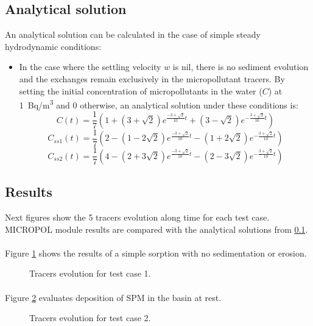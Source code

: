 \subsection{Analytical solution}
\label{Analytical}
An analytical solution can be calculated in the case of simple steady hydrodynamic conditions:
\begin{itemize}
\item In the case where the settling velocity $w$ is nil, there is no
  sediment evolution and the exchanges remain exclusively in the
  micropollutant tracers. By setting the initial concentration of
  micropollutants in the water ($C$) at 1~Bq/m\textsuperscript{3}
  and 0 otherwise, an analytical solution under these conditions is:
  $$ C(t)=\frac{1}{7}(1+(3+\sqrt{2})e^{\frac{-3+\sqrt{2}}{10}t}+(3-\sqrt{2})e^{-\frac{3+\sqrt{2}}{10}t})$$
  $$ C_{ss1}(t)=\frac{1}{7}(2-(1-2\sqrt{2})e^{\frac{-3+\sqrt{2}}{10}t}-(1+2\sqrt{2})e^{-\frac{3+\sqrt{2}}{10}t})$$
  $$ C_{ss2}(t)=\frac{1}{7}(4-(2+3\sqrt{2})e^{\frac{-3+\sqrt{2}}{10}t}-(2-3\sqrt{2})e^{-\frac{3+\sqrt{2}}{10}t})$$
\end{itemize}


\subsection{Results}

Next figures show the 5 tracers evolution along time for each test case.
MICROPOL module results are compared with the analytical solutions from
\ref{Analytical}.

\paragraph{}
Figure \ref{fig:waq2d_micropol:kin2_1} shows the results of a simple sorption
with no sedimentation or erosion.

\begin{figure} [H]
\centering
{}
\caption{Tracers evolution for test case 1.}
 \label{fig:waq2d_micropol:kin2_1}
\end{figure}

\paragraph{}
Figure \ref{fig:waq2d_micropol:kin2_2} evaluates deposition of SPM in the
basin at rest.

\begin{figure} [H]
\centering
{}
 \caption{Tracers evolution for test case 2.}
 \label{fig:waq2d_micropol:kin2_2}
\end{figure}

